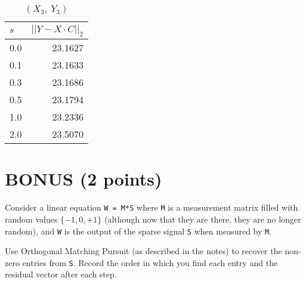 \documentclass[11pt]{article}
\begin{document}
\begin{table}[H]
\centering
\caption{$(X_{3},\ Y_{3})$}
\begin{tabular}{@{}l r@{}}
\hline\hline
$s$ & $\left|\left| Y - X\cdot C\right|\right|_{2}$\\
\hline
0.0 & 23.1627 \\
0.1 & 23.1633 \\
0.3 & 23.1686 \\
0.5 & 23.1794 \\
1.0 & 23.2336 \\
2.0 & 23.5070 \\
\hline
\end{tabular}
\end{table}

\section{BONUS (2 points)}

Consider a linear equation \texttt{W = M*S} where \texttt{M} is a measurement matrix filled with random values $\{-1, 0, +1\}$ (although now that they are there, they are no longer random), and \texttt{W} is the output of the sparse signal \texttt{S} when measured by \texttt{M}.  

Use Orthogonal Matching Pursuit (as described in the notes) to recover the non-zero entries from \texttt{S}.  Record the order in which you find each entry and the residual vector after each step.  
\end{document}
